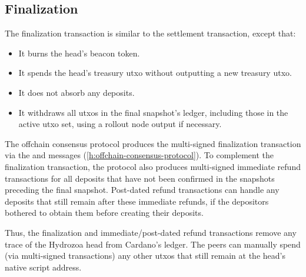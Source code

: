 \documentclass[../hydrozoa.tex]{subfiles}
\begin{document}

\subsection{Finalization}%
\label{h:multisig-finalize}
The finalization transaction is similar to the settlement transaction, except that:
\begin{itemize}
  \item It burns the head's beacon token.
  \item It spends the head's treasury utxo without outputting a new treasury utxo.
  \item It does not absorb any deposits.
  \item It withdraws all utxos in the final snapshot's ledger, including those in the active utxo set, using a rollout node output if necessary.
\end{itemize}

The offchain consensus protocol produces the multi-signed finalization transaction via the  and  messages (\cref{h:offchain-consensus-protocol}).
To complement the finalization transaction, the protocol also produces multi-signed immediate refund transactions for all deposits that have not been confirmed in the snapshots preceding the final snapshot.
Post-dated refund transactions can handle any deposits that still remain after these immediate refunds, if the depositors bothered to obtain them before creating their deposits.

Thus, the finalization and immediate/post-dated refund transactions remove any trace of the Hydrozoa head from Cardano's ledger.
The peers can manually spend (via multi-signed transactions) any other utxos that still remain at the head's native script address.
\end{document}
